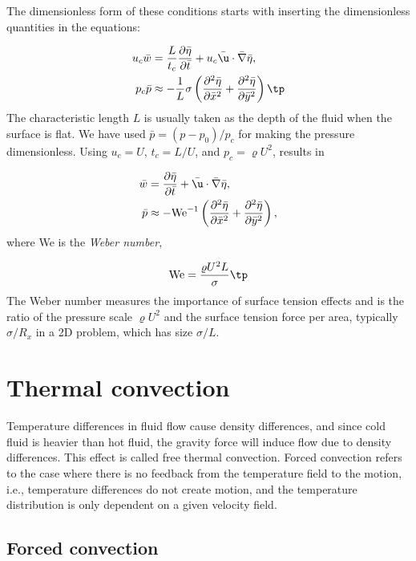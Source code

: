 \documentclass[graybox,envcountchap,sectrefs,final]{svmonodo}
\begin{document}

The dimensionless form of these conditions starts with inserting the
dimensionless quantities in the equations:

\begin{align*}
u_c\bar w &= \frac{L}{t_c}
\frac{\partial\bar\eta}{\partial\bar t} +
u_c\bar\u\cdot\bar\nabla\bar\eta,\\ 
p_c \bar p &\approx
-\frac{1}{L}\sigma\left(\frac{\partial^2\bar\eta}{\partial \bar x^2} +
\frac{\partial^2\bar\eta}{\partial \bar y^2}\right)\tp
\end{align*}
The characteristic length $L$ is usually taken as the depth of the fluid
when the surface is flat. We have used
$\bar p = (p - p_0)/p_c$ for making the pressure dimensionless.
Using $u_c=U$, $t_c=L/U$, and $p_c = \varrho U^2$, results in

\begin{align}
\bar w &= \frac{\partial\bar\eta}{\partial\bar t} +
\bar\u\cdot\bar\nabla\bar\eta,\\ 
\bar p &\approx
- \hbox{We}^{-1}\left(\frac{\partial^2\bar\eta}{\partial \bar x^2} +
\frac{\partial^2\bar\eta}{\partial \bar y^2}\right),
\label{scale:fluid:NS:surface_tension2}
\end{align}
where We is the \emph{Weber number},

\begin{equation}
\hbox{We} = \frac{\varrho U^2L}{\sigma}\tp
\end{equation}
The Weber number measures the importance of surface tension effects and
is the ratio of the pressure scale $\varrho U^2$ and the surface
tension force per area, typically $\sigma/R_x$ in a 2D problem, which
has size $\sigma/L$.

\section{Thermal convection}

Temperature differences in fluid flow cause density differences, and since
cold fluid is heavier than hot fluid, the gravity force will induce
flow due to density differences. This effect is called free thermal
convection. Forced convection refers to the case where there is no
feedback from the temperature field to the motion, i.e., temperature
differences do not create motion, and the temperature distribution
is only dependent on a given velocity field.

\subsection{Forced convection}
\end{document}
